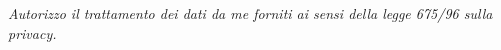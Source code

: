 \documentclass[pdftex,11pt,a4paper]{moderncv}
\begin{document}
\renewcommand{\listitemsymbol}{-} %

\section{}
\emph{Autorizzo il trattamento dei dati da me forniti ai sensi della legge 675/96 sulla privacy.}
\end{document}
